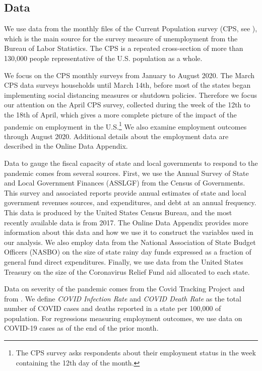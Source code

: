 \subsection{Data}
We use data from the monthly files of the Current Population survey (CPS, see \cite{IPUM_CPS:2020:Microdata}), which is the main source for the survey measure of unemployment from the Bureau of Labor Statistics. 
The CPS is a repeated cross-section of more than 130,000 people representative of the U.S. population as a whole. 

We focus on the CPS monthly surveys from January to August 2020. The March CPS data surveys households until March 14th, before most of the states began implementing social distancing measures or shutdown policies. Therefore we focus our attention on the April CPS survey, collected during the week of the 12th to the 18th of April, which gives a more complete picture of the impact of the pandemic on employment  in the U.S.\footnote{The CPS survey asks respondents about their employment status in the week containing the 12th day of the month.} We also examine employment outcomes through August 2020. Additional details about the employment data are described in the Online Data Appendix.

Data to gauge the fiscal capacity of state and local governments to respond to the pandemic comes from several sources. First, we use the Annual Survey of State and Local Government Finances (ASSLGF) from the Census of Governments. This survey and associated reports provide annual estimates of state and local government revenues sources, and expenditures, and debt at an annual frequency. This data is produced by the United States Census Bureau, and the most recently available data is from 2017. The Online Data Appendix provides more information about this data and how we use it to construct the variables used in our analysis. We also employ data from the National Association of State Budget Officers (NASBO) on the size of state rainy day funds expressed as a fraction of general fund direct expenditures. Finally, we use data from the United States Treasury on the size of the Coronavirus Relief Fund aid allocated to each state.

Data on severity of the pandemic comes from the Covid Tracking Project and from \cite{CovidUSState:2020:BU}. We define \emph{COVID Infection Rate} and \emph{COVID Death Rate} as the total number of COVID cases and deaths reported in a state per 100,000 of population. For regressions measuring employment outcomes, we use data on COVID-19 cases as of the end of the prior month. 


